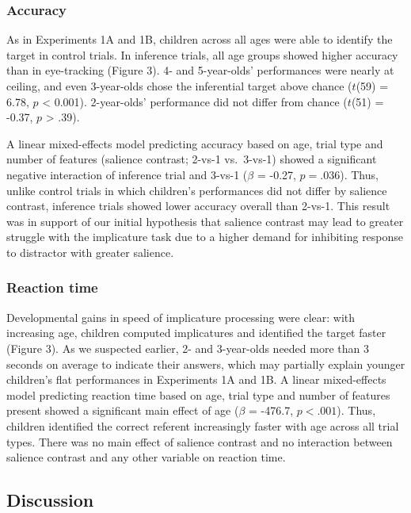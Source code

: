 \documentclass{rsos}
\begin{document}
\subsubsection{Accuracy}\label{accuracy-2}

As in Experiments 1A and 1B, children across all ages were able to
identify the target in control trials. In inference trials, all age
groups showed higher accuracy than in eye-tracking (Figure 3). 4- and
5-year-olds' performances were nearly at ceiling, and even 3-year-olds
chose the inferential target above chance (\(t\)(59) = 6.78, \(p\)
\textless{} 0.001). 2-year-olds' performance did not differ from chance
(\(t\)(51) = -0.37, \(p\) \textgreater{} .39).

A linear mixed-effects model predicting accuracy based on age, trial
type and number of features (salience contrast; 2-vs-1 vs.~3-vs-1)
showed a significant negative interaction of inference trial and 3-vs-1
(\(\beta\) = -0.27, \(p = .036\)). Thus, unlike control trials in which
children's performances did not differ by salience contrast, inference
trials showed lower accuracy overall than 2-vs-1. This result was in
support of our initial hypothesis that salience contrast may lead to
greater struggle with the implicature task due to a higher demand for
inhibiting response to distractor with greater salience.

\subsubsection{Reaction time}\label{reaction-time}

Developmental gains in speed of implicature processing were clear: with
increasing age, children computed implicatures and identified the target
faster (Figure 3). As we suspected earlier, 2- and 3-year-olds needed
more than 3 seconds on average to indicate their answers, which may
partially explain younger children's flat performances in Experiments 1A
and 1B. A linear mixed-effects model predicting reaction time based on
age, trial type and number of features present showed a significant main
effect of age (\(\beta\) = -476.7, \(p < .001\)). Thus, children
identified the correct referent increasingly faster with age across all
trial types. There was no main effect of salience contrast and no
interaction between salience contrast and any other variable on reaction
time.

\subsection{Discussion}\label{discussion-2}
\end{document}
